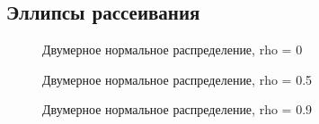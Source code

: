 \subsection{Эллипсы рассеивания}

\begin{figure}[h]
\caption{Двумерное нормальное распределение, rho = 0}
\label{fig:box20}
\end{figure}

\begin{figure}[h]
\caption{Двумерное нормальное распределение, rho = 0.5}
\label{fig:box20}
\end{figure}

\begin{figure}[h]
\caption{Двумерное нормальное распределение, rho = 0.9}
\label{fig:box}
\end{figure}

